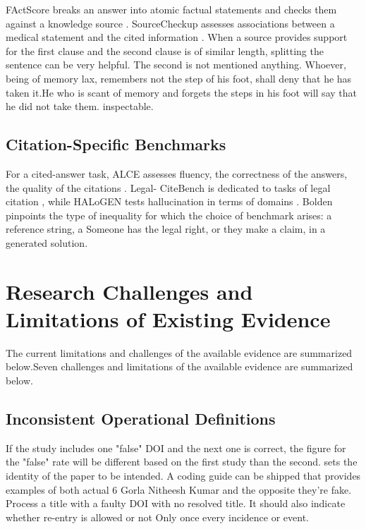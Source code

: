 \documentclass[acmsmall,screen,nonacm]{acmart}
\begin{document}
FActScore breaks an answer into atomic factual statements and checks them against a knowledge source \cite{ref16}. SourceCheckup assesses associations between a medical statement and the cited information \cite{ref23}. When a source provides support for the first clause and the second clause is of similar length, splitting the sentence can be very helpful. The second is not mentioned anything. Whoever, being of memory lax, remembers not the step of his foot, shall deny that he has taken it.He who is scant of memory and forgets the steps in his foot will say that he did not take them. inspectable.

\subsection{Citation-Specific Benchmarks}

For a cited-answer task, ALCE assesses fluency, the correctness of the answers, the quality of the citations \cite{ref8}. Legal- CiteBench is dedicated to tasks of legal citation \cite{ref5}, while HALoGEN tests hallucination in terms of domains \cite{ref20}. Bolden pinpoints the type of inequality for which the choice of benchmark arises: a reference string, a Someone has the legal right, or they make a claim, in a generated solution.

\section{Research Challenges and Limitations of Existing Evidence}

The current limitations and challenges of the available evidence are summarized below.Seven challenges and limitations of the available evidence are summarized below.

\subsection{Inconsistent Operational Definitions}

If the study includes one "false" DOI and the next one is correct, the figure for the "false" rate will be different based on the first study than the second. sets the identity of the paper to be intended. A coding guide can be shipped that provides examples of both actual 6 Gorla Nitheesh Kumar and the opposite they’re fake. Process a title with a faulty DOI with no resolved title. It should also indicate whether re-entry is allowed or not Only once every incidence or event.
\end{document}
